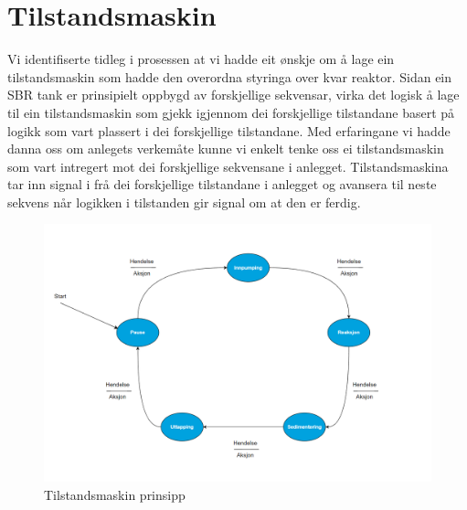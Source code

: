 \section{Tilstandsmaskin}
\thispagestyle{fancy}

Vi identifiserte tidleg i prosessen at vi hadde eit ønskje om å lage ein tilstandsmaskin som hadde den 
overordna styringa over kvar reaktor. 
Sidan ein SBR tank er prinsipielt oppbygd av forskjellige sekvensar, virka det logisk å lage til ein 
tilstandsmaskin som gjekk igjennom dei forskjellige tilstandane basert på logikk som vart plassert i dei forskjellige tilstandane. 
Med erfaringane vi hadde danna oss om anlegets verkemåte 
kunne vi enkelt tenke oss ei tilstandsmaskin som vart intregert mot dei forskjellige sekvensane i anlegget. 
Tilstandsmaskina tar inn signal i frå dei forskjellige tilstandane i anlegget og avansera til neste 
sekvens når logikken i tilstanden gir signal om at den er ferdig. 


\begin{figure}[htbp]
    \centering
    \includegraphics[width=1\textwidth]{Figurar/Tom tilstandsmaskin.png}
    \caption{Tilstandsmaskin prinsipp}\label{fig:Tilstandsmaskin prinsipp}    
\end{figure}

\newpage

